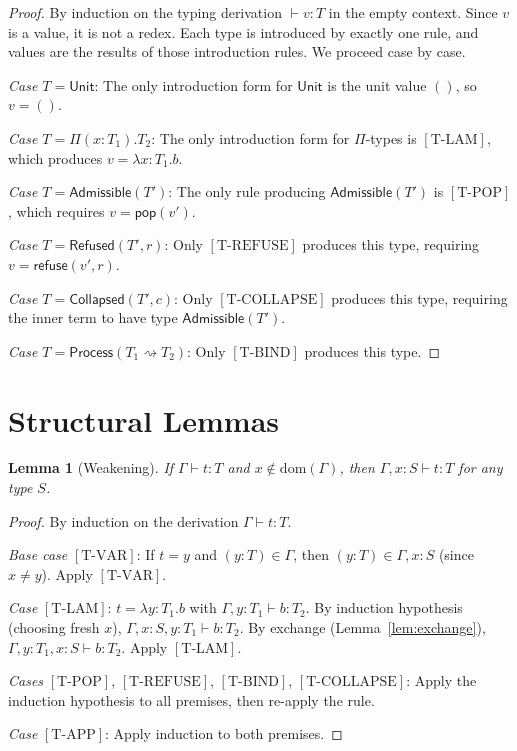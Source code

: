 \documentclass[12pt, a4paper, openany]{book}
\theoremstyle{plain}
\newtheorem{lemma}[theorem]{Lemma}
\theoremstyle{definition}
\theoremstyle{remark}
\newcommand{\Adm}{\mathsf{Admissible}}
\newcommand{\Rfsd}{\mathsf{Refused}}
\newcommand{\Col}{\mathsf{Collapsed}}
\newcommand{\Proc}{\mathsf{Process}}
\begin{document}
\begin{proof}
By induction on the typing derivation $\vdash v : T$ in the empty context.
Since $v$ is a value, it is not a redex. Each type is introduced by exactly
one rule, and values are the results of those introduction rules. We proceed
case by case.

\textit{Case $T = \mathsf{Unit}$}: The only introduction form for $\mathsf{Unit}$
is the unit value $()$, so $v = ()$.

\textit{Case $T = \Pi(x:T_1).T_2$}: The only introduction form for $\Pi$-types
is $[\mathrm{T\text{-}LAM}]$, which produces $v = \lambda x:T_1.b$.

\textit{Case $T = \Adm(T')$}: The only rule producing $\Adm(T')$ is
$[\mathrm{T\text{-}POP}]$, which requires $v = \mathsf{pop}(v')$.

\textit{Case $T = \Rfsd(T', r)$}: Only $[\mathrm{T\text{-}REFUSE}]$ produces
this type, requiring $v = \mathsf{refuse}(v', r)$.

\textit{Case $T = \Col(T', c)$}: Only $[\mathrm{T\text{-}COLLAPSE}]$ produces
this type, requiring the inner term to have type $\Adm(T')$.

\textit{Case $T = \Proc(T_1 \rightsquigarrow T_2)$}: Only $[\mathrm{T\text{-}BIND}]$
produces this type.
\end{proof}

\section{Structural Lemmas}

\begin{lemma}[Weakening]
\label{lem:weakening}
If $\Gamma \vdash t : T$ and $x \notin \mathrm{dom}(\Gamma)$, then
$\Gamma, x : S \vdash t : T$ for any type $S$.
\end{lemma}

\begin{proof}
By induction on the derivation $\Gamma \vdash t : T$.

\textit{Base case} $[\mathrm{T\text{-}VAR}]$: If $t = y$ and $(y : T) \in \Gamma$,
then $(y : T) \in \Gamma, x : S$ (since $x \neq y$). Apply $[\mathrm{T\text{-}VAR}]$.

\textit{Case} $[\mathrm{T\text{-}LAM}]$: $t = \lambda y:T_1.b$ with $\Gamma, y:T_1
\vdash b : T_2$. By induction hypothesis (choosing fresh $x$),
$\Gamma, x:S, y:T_1 \vdash b : T_2$. By exchange (Lemma~\ref{lem:exchange}),
$\Gamma, y:T_1, x:S \vdash b : T_2$. Apply $[\mathrm{T\text{-}LAM}]$.

\textit{Cases} $[\mathrm{T\text{-}POP}]$, $[\mathrm{T\text{-}REFUSE}]$,
$[\mathrm{T\text{-}BIND}]$, $[\mathrm{T\text{-}COLLAPSE}]$: Apply the induction
hypothesis to all premises, then re-apply the rule.

\textit{Case} $[\mathrm{T\text{-}APP}]$: Apply induction to both premises.
\end{proof}
\end{document}
